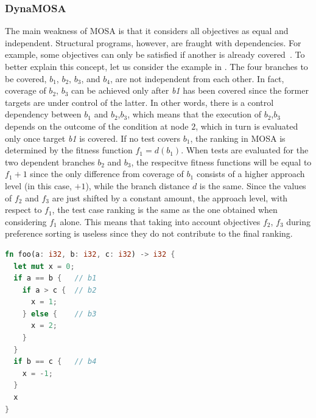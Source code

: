 \documentclass[paper=a4,%
  twoside,%
  BCOR4mm,%
  abstract=true,%
  toc=bibliography,%
  chapterprefix=true,%
  toc=bibliographynumbered,%
  open=right,%
  english,%
  pagesize=pdftex]{scrreprt}
\begin{document}
\subsubsection{DynaMOSA}
The main weakness of \ac{MOSA} is that it considers all objectives as equal and independent. Structural programs, however, are fraught with dependencies. For example, some objectives can only be satisfied if another is already covered~\cite{Fraser_2013}. To better explain this concept, let us consider the example in . The four branches to be covered, $b_1$, $b_2$, $b_3$, and $b_4$, are not independent from each other. In fact, coverage of $b_2$, $b_3$ can be achieved only after \textit{b1} has been covered since the former targets are under control of the latter. In other words, there is a control dependency between $b_1$ and $b_2$,$b_3$, which means that the execution of $b_2$,$b_3$ depends on the outcome of the condition at node $2$, which in turn is evaluated only once target \textit{b1} is covered. If no test covers $b_1$, the ranking in \ac{MOSA} is determined by the fitness function $f_1 = d(b_1)$. When tests are evaluated for the two dependent branches $b_2$ and $b_3$, the respecitve fitness functions will be equal to $f_1 + 1$ since the only difference from coverage of $b_1$ consists of a higher approach level (in this case, $+1$), while the branch distance $d$ is the same. Since the values of $f_2$ and $f_3$ are just shifted by a constant amount, the approach level, with respect to $f_1$, the test case ranking is the same as the one obtained when considering $f_1$ alone. This means that taking into account objectives $f_2$, $f_3$ during preference sorting is useless since they do not contribute to the final ranking.

\begin{lstlisting}[language=Rust, style=boxed, caption={A nested function with control dependent blocks}, label=lst:example-control-dependencies]
fn foo(a: i32, b: i32, c: i32) -> i32 {
  let mut x = 0;
  if a == b {   // b1
    if a > c {  // b2
      x = 1;
    } else {    // b3
      x = 2;
    }
  }
  if b == c {   // b4
    x = -1;
  }
  x
}
\end{lstlisting}
\end{document}
